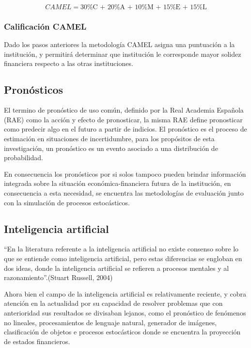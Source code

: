 \documentclass[
  12pt,
]{article}
\begin{document}
\[CAMEL = \text{30\%C + 20\%A + 10\%M + 15\%E + 15\%L}\]

\hypertarget{calificaciuxf3n-camel}{%
\subsubsection{Calificación CAMEL}\label{calificaciuxf3n-camel}}

Dado los pasos anteriores la metodología CAMEL asigna una puntuación a
la institución, y permitirá determinar que institución le corresponde
mayor solidez financiera respecto a las otras instituciones.

\hypertarget{pronuxf3sticos}{%
\subsection{Pronósticos}\label{pronuxf3sticos}}

El termino de pronóstico de uso común, definido por la Real Academia
Española (RAE) como la acción y efecto de pronosticar, la misma RAE
define pronosticar como predecir algo en el futuro a partir de indicios.
El pronóstico es el proceso de estimación en situaciones de
incertidumbre, para los propósitos de esta investigación, un pronóstico
es un evento asociado a una distribución de probabilidad.

En consecuencia los pronósticos por si solos tampoco pueden brindar
información integrada sobre la situación económica-financiera futura de
la institución, en consecuencia a esta necesidad, se encuentra las
metodologías de evaluación junto con la simulación de procesos
estocásticos.

\hypertarget{inteligencia-artificial}{%
\subsection{Inteligencia artificial}\label{inteligencia-artificial}}

``En la literatura referente a la inteligencia artificial no existe
consenso sobre lo que se entiende como inteligencia artificial, pero
estas diferencias se engloban en dos ideas, donde la inteligencia
artificial se refieren a procesos mentales y al razonamiento''.(Stuart
Russell, 2004)

Ahora bien el campo de la inteligencia artificial es relativamente
reciente, y cobra atención en la actualidad por su capacidad de resolver
problemas que con anterioridad sus resultados se divisaban lejanos, como
el pronóstico de fenómenos no lineales, procesamientos de lenguaje
natural, generador de imágenes, clasificación de objetos e procesos
estocásticos donde se encuentra la proyección de estados financieros.
\end{document}
